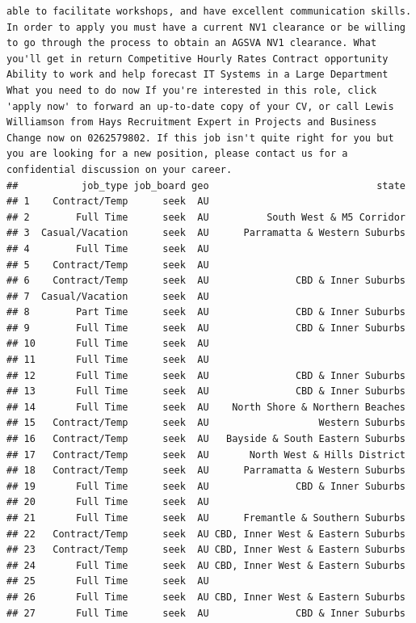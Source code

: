 \documentclass[11pt,a4paper,]{article}
\begin{document}
\begin{verbatim}
able to facilitate workshops, and have excellent communication skills. In order to apply you must have a current NV1 clearance or be willing to go through the process to obtain an AGSVA NV1 clearance. What you'll get in return Competitive Hourly Rates Contract opportunity Ability to work and help forecast IT Systems in a Large Department What you need to do now If you're interested in this role, click 'apply now' to forward an up-to-date copy of your CV, or call Lewis Williamson from Hays Recruitment Expert in Projects and Business Change now on 0262579802. If this job isn't quite right for you but you are looking for a new position, please contact us for a confidential discussion on your career.
##           job_type job_board geo                             state
## 1    Contract/Temp      seek  AU                                  
## 2        Full Time      seek  AU          South West & M5 Corridor
## 3  Casual/Vacation      seek  AU      Parramatta & Western Suburbs
## 4        Full Time      seek  AU                                  
## 5    Contract/Temp      seek  AU                                  
## 6    Contract/Temp      seek  AU               CBD & Inner Suburbs
## 7  Casual/Vacation      seek  AU                                  
## 8        Part Time      seek  AU               CBD & Inner Suburbs
## 9        Full Time      seek  AU               CBD & Inner Suburbs
## 10       Full Time      seek  AU                                  
## 11       Full Time      seek  AU                                  
## 12       Full Time      seek  AU               CBD & Inner Suburbs
## 13       Full Time      seek  AU               CBD & Inner Suburbs
## 14       Full Time      seek  AU    North Shore & Northern Beaches
## 15   Contract/Temp      seek  AU                   Western Suburbs
## 16   Contract/Temp      seek  AU   Bayside & South Eastern Suburbs
## 17   Contract/Temp      seek  AU       North West & Hills District
## 18   Contract/Temp      seek  AU      Parramatta & Western Suburbs
## 19       Full Time      seek  AU               CBD & Inner Suburbs
## 20       Full Time      seek  AU                                  
## 21       Full Time      seek  AU      Fremantle & Southern Suburbs
## 22   Contract/Temp      seek  AU CBD, Inner West & Eastern Suburbs
## 23   Contract/Temp      seek  AU CBD, Inner West & Eastern Suburbs
## 24       Full Time      seek  AU CBD, Inner West & Eastern Suburbs
## 25       Full Time      seek  AU                                  
## 26       Full Time      seek  AU CBD, Inner West & Eastern Suburbs
## 27       Full Time      seek  AU               CBD & Inner Suburbs

\end{verbatim}
\end{document}
